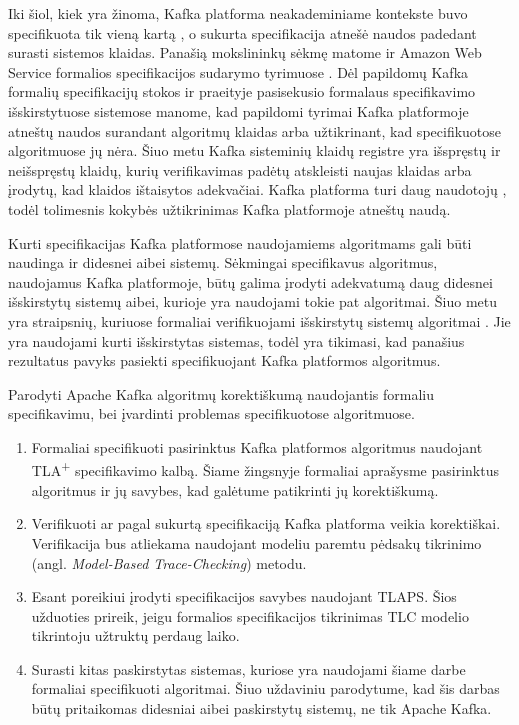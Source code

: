 \documentclass{VUMIFPSmagistrinis}
\begin{document}
		Iki šiol, kiek yra žinoma, Kafka platforma neakademiniame kontekste buvo specifikuota tik vieną kartą \cite{kfkTla}, o sukurta specifikacija atnešė naudos padedant surasti sistemos klaidas.
		Panašią mokslininkų sėkmę matome ir Amazon Web Service formalios specifikacijos sudarymo tyrimuose \cite{newcombe2014use}.
		Dėl papildomų Kafka formalių specifikacijų stokos ir praeityje pasisekusio formalaus specifikavimo išskirstytuose sistemose manome, kad papildomi tyrimai Kafka platformoje atneštų naudos surandant algoritmų klaidas arba užtikrinant, kad specifikuotose algoritmuose jų nėra.
		Šiuo metu Kafka sisteminių klaidų registre \cite{kfkissue} yra išspręstų ir neišspręstų  klaidų, kurių verifikavimas padėtų atskleisti naujas klaidas arba įrodytų, kad klaidos ištaisytos adekvačiai.
		Kafka platforma turi daug naudotojų \cite{kfk}, todėl tolimesnis kokybės užtikrinimas Kafka platformoje atneštų naudą.

		
		Kurti specifikacijas Kafka platformose naudojamiems algoritmams gali būti naudinga ir didesnei aibei sistemų. 
		Sėkmingai specifikavus algoritmus, naudojamus Kafka platformoje, būtų galima įrodyti adekvatumą daug didesnei išskirstytų sistemų aibei, kurioje yra naudojami tokie pat algoritmai. 
		Šiuo metu yra straipsnių, kuriuose formaliai verifikuojami išskirstytų sistemų algoritmai \cite{lamport2005generalized}. Jie yra naudojami kurti išskirstytas sistemas, todėl yra tikimasi, kad panašius rezultatus pavyks pasiekti specifikuojant Kafka platformos algoritmus.
	
		Parodyti Apache Kafka algoritmų korektiškumą naudojantis formaliu specifikavimu, bei įvardinti problemas specifikuotose algoritmuose.


	
		\begin{enumerate}
			\item{Formaliai specifikuoti pasirinktus Kafka platformos algoritmus naudojant TLA\textsuperscript{+} specifikavimo kalbą. Šiame žingsnyje formaliai aprašysme pasirinktus algoritmus ir jų savybes, kad galėtume patikrinti jų korektiškumą.}
			\item{Verifikuoti ar pagal sukurtą specifikaciją Kafka platforma veikia korektiškai. Verifikacija bus atliekama naudojant modeliu paremtu pėdsakų tikrinimo (angl. {\it Model-Based Trace-Checking}) metodu. }
			\item{Esant poreikiui įrodyti specifikacijos savybes naudojant TLAPS. Šios užduoties prireik, jeigu formalios specifikacijos tikrinimas TLC modelio tikrintoju užtruktų perdaug laiko.}
			\item{Surasti kitas paskirstytas sistemas, kuriose yra naudojami šiame darbe formaliai specifikuoti algoritmai. Šiuo uždaviniu parodytume, kad šis darbas būtų pritaikomas didesniai aibei paskirstytų sistemų, ne tik Apache Kafka.}
		\end{enumerate}
	
\end{document}

